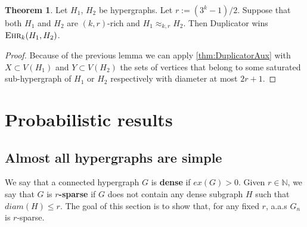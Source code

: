 \documentclass[12pt,notitlepage,a4paper]{article}
\theoremstyle{definition}
\newtheorem{theorem}{Theorem}[section]
\newcommand{\N}{\mathbb{N}}
\newcommand{\ehr}{\textsc{Ehr}}
\begin{document}
\begin{theorem}\label{thm:Duplicatorwins}
	Let $H_1$, $H_2$ be hypergraphs. Let $r:=(3^k-1)/2$. Suppose
	that both $H_1$ and $H_2$ are $(k,r)$-rich and
	$H_1\approx_{k,r} H_2$. Then Duplicator wins $\ehr_{k}(H_1,H_2)$.
\end{theorem}
	\begin{proof}
		Because of the previous lemma we can apply 
		\cref{thm:DuplicatorAux} with $X\subset V(H_1)$ 
		and	$Y\subset V(H_2)$ the sets of vertices that belong
		to some saturated sub-hypergraph of $H_1$ or $H_2$ respectively
		with diameter at most $2r+1$.
	\end{proof}


\section{Probabilistic results}



\subsection{Almost all hypergraphs are simple}


We say that a connected hypergraph $G$ is \textbf{dense} if
$ex(G)>0$. Given $r\in \N$, we say that $G$ is \textbf{$r$-sparse}
if $G$ does not contain any dense subgraph $H$ such that 
$diam(H)\leq r$. The goal of this section is to show that, for any
fixed $r$, a.a.s $G_n$ is $r$-sparse.\par
\end{document}
